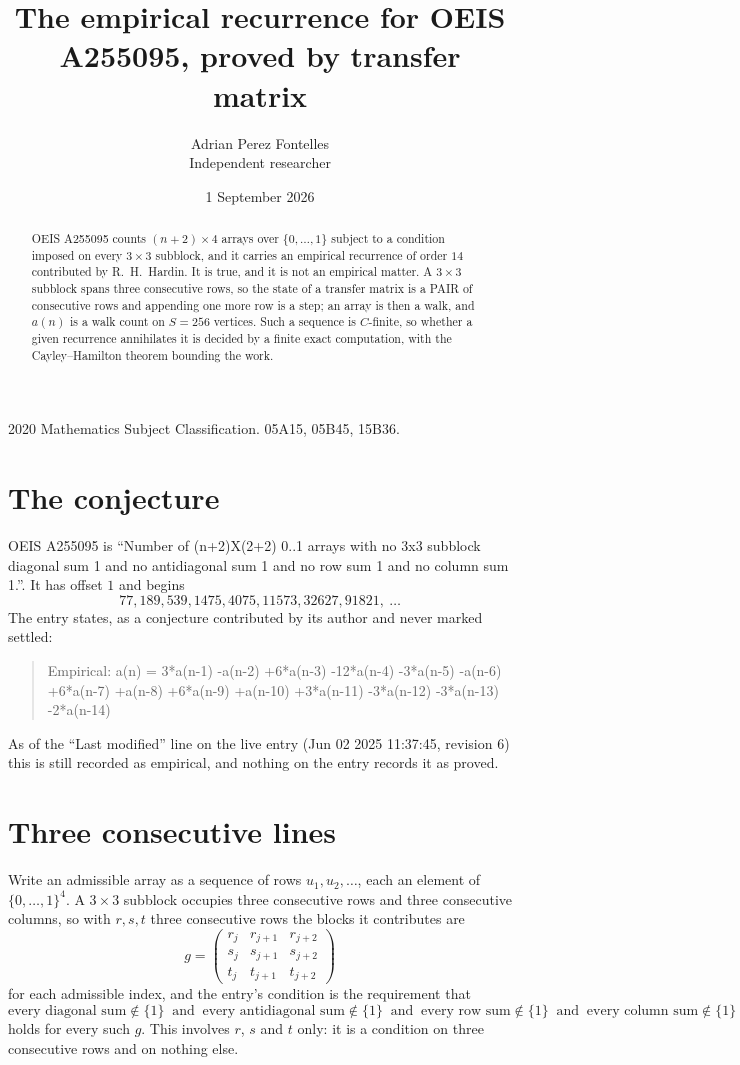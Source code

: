 \documentclass[11pt,a4paper]{article}
\title{The empirical recurrence for OEIS A255095, proved by transfer matrix}
\author{Adrian Perez Fontelles\\ \small Independent researcher}
\date{1 September 2026}
\theoremstyle{plain}
\theoremstyle{definition}
\begin{document}
\maketitle

\begin{abstract}
OEIS A255095 counts $(n+2)\times4$ arrays over $\{0,\dots,1\}$ subject to a condition imposed on
every $3\times3$ subblock, and it carries an empirical recurrence of order $14$
contributed by R.~H.~Hardin. It is true, and it is not an empirical matter. A $3\times3$
subblock spans three consecutive rows, so the state of a transfer matrix is a PAIR of
consecutive rows and appending one more row is a step; an array is then a walk, and
$a(n)$ is a walk count on $S=256$ vertices. Such a sequence is $C$-finite, so whether a given
recurrence annihilates it is decided by a finite exact computation, with the Cayley--Hamilton
theorem bounding the work.
\end{abstract}

\noindent\small 2020 Mathematics Subject Classification. 05A15, 05B45, 15B36.\normalsize

\section{The conjecture}

OEIS A255095 is ``Number of (n+2)X(2+2) 0..1 arrays with no 3x3 subblock diagonal sum 1 and no antidiagonal sum 1 and no row sum 1 and no column sum 1.''. It has offset $1$ and begins
\[
77, 189, 539, 1475, 4075, 11573, 32627, 91821,\ \dots
\]
The entry states, as a conjecture contributed by its author and never marked settled:
\begin{quote}
Empirical: a(n) = 3*a(n-1) -a(n-2) +6*a(n-3) -12*a(n-4) -3*a(n-5) -a(n-6) +6*a(n-7) +a(n-8) +6*a(n-9) +a(n-10) +3*a(n-11) -3*a(n-12) -3*a(n-13) -2*a(n-14)
\end{quote}
As of the ``Last modified'' line on the live entry (Jun 02 2025 11:37:45, revision 6) this is still
recorded as empirical, and nothing on the entry records it as proved.

\section{Three consecutive lines}

Write an admissible array as a sequence of rows $u_1,u_2,\dots$, each an element of
$\{0,\dots,1\}^{4}$. A $3\times3$ subblock occupies three consecutive rows and
three consecutive columns, so with $r,s,t$ three consecutive rows the blocks it
contributes are
\[
g=\begin{pmatrix}r_j&r_{j+1}&r_{j+2}\\ s_j&s_{j+1}&s_{j+2}\\ t_j&t_{j+1}&t_{j+2}\end{pmatrix}
\]
for each admissible index, and the entry's condition is the requirement that
\[
\text{every diagonal sum} \notin \{1\}\ \text{ and }\ \text{every antidiagonal sum} \notin \{1\}\ \text{ and }\ \text{every row sum} \notin \{1\}\ \text{ and }\ \text{every column sum} \notin \{1\}
\]
holds for every such $g$. This involves $r$, $s$ and $t$ only: it is a condition on
three consecutive rows and on nothing else.
\end{document}
